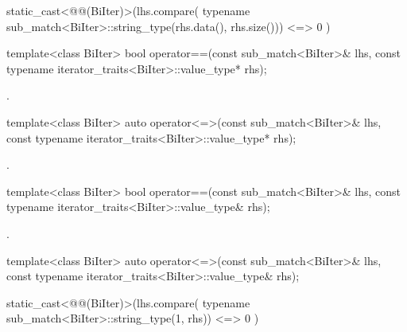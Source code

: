 \begin{itemdescr}
\pnum
\returns
\begin{codeblock}
static_cast<@@(BiIter)>(lhs.compare(
    typename sub_match<BiIter>::string_type(rhs.data(), rhs.size()))
      <=> 0
    )
\end{codeblock}
\end{itemdescr}

%
\begin{itemdecl}
template<class BiIter>
  bool operator==(const sub_match<BiIter>& lhs,
                  const typename iterator_traits<BiIter>::value_type* rhs);
\end{itemdecl}

\begin{itemdescr}
\pnum
\returns
{}.
\end{itemdescr}

%
\begin{itemdecl}
template<class BiIter>
  auto operator<=>(const sub_match<BiIter>& lhs,
                   const typename iterator_traits<BiIter>::value_type* rhs);
\end{itemdecl}

\begin{itemdescr}
\pnum
\returns
{}.
\end{itemdescr}

%
\begin{itemdecl}
template<class BiIter>
  bool operator==(const sub_match<BiIter>& lhs,
                  const typename iterator_traits<BiIter>::value_type& rhs);
\end{itemdecl}

\begin{itemdescr}
\pnum
\returns
{}.
\end{itemdescr}

%
\begin{itemdecl}
template<class BiIter>
  auto operator<=>(const sub_match<BiIter>& lhs,
                   const typename iterator_traits<BiIter>::value_type& rhs);
\end{itemdecl}

\begin{itemdescr}
\pnum
\returns
\begin{codeblock}
static_cast<@@(BiIter)>(lhs.compare(
    typename sub_match<BiIter>::string_type(1, rhs))
      <=> 0
    )
\end{codeblock}
\end{itemdescr}


